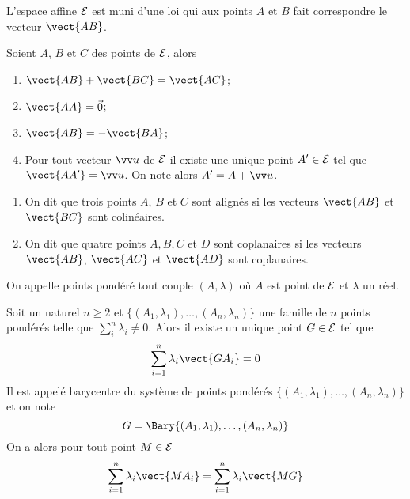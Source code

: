 L'espace affine $\mathcal{E}$ est muni d'une loi qui aux points $A$ et $B$ fait correspondre le vecteur $\vect{AB}$.

\begin{prop}
  Soient $A$, $B$ et $C$ des points de $\mathcal{E}$, alors
  \begin{enumerate}
  \item $\vect{AB}+\vect{BC} = \vect{AC}$;
  \item $\vect{AA}=\vec{0}$;
  \item $\vect{AB} = -\vect{BA}$;
  \item Pour tout vecteur $\vu$ de $\mathcal{E}$ il existe une unique point $A' \in \mathcal{E}$ tel que $\vect{AA'}=\vu$. On note alors $A'=A+\vu$.
  \end{enumerate}
\end{prop}
\begin{defdef}
  \begin{enumerate}
  \item On dit que trois points $A$, $B$ et $C$ sont alignés si les vecteurs $\vect{AB}$ et $\vect{BC}$ sont colinéaires.
  \item On dit que quatre points $A, B, C$ et $D$ sont coplanaires si les vecteurs $\vect{AB}$, $\vect{AC}$ et $\vect{AD}$ sont coplanaires.
  \end{enumerate}
\end{defdef}
\begin{defdef}
  On appelle points pondéré tout couple $(A,\lambda)$ où $A$ est point de $\mathcal{E}$ et $\lambda$ un réel.
\end{defdef}
\begin{prop}
Soit un naturel $n \geq 2$ et $\{(A_1,\lambda_1), \ldots, (A_n,\lambda_n)\}$ une famille de $n$ points pondérés telle que $\sum_i^n\lambda_i \neq 0$. Alors il existe un unique point $G \in \mathcal{E}$ tel que
\begin{equation}
  \sum_{i=1}^n \lambda_i \vect{GA_i}=0
\end{equation}
Il est appelé barycentre du système de points pondérés $\{(A_1,\lambda_1), \ldots, (A_n,\lambda_n)\}$ et on note
\begin{equation}
  G = \Bary\{(A_1,\lambda_1), \ldots, (A_n,\lambda_n)\}
\end{equation}
On a alors pour tout point $M \in \mathcal{E}$
\begin{equation}
  \sum_{i=1}^n \lambda_i \vect{MA_i} = \sum_{i=1}^n \lambda_i \vect{MG}
\end{equation}
\end{prop}
